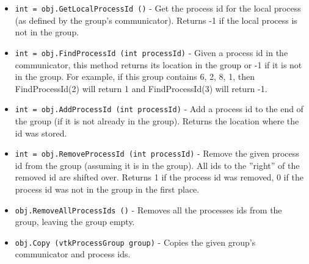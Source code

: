 \begin{itemize}
\item  \verb|int = obj.GetLocalProcessId ()| -  Get the process id for the local process (as defined by the group's
 communicator).  Returns -1 if the local process is not in the group.

\item  \verb|int = obj.FindProcessId (int processId)| -  Given a process id in the communicator, this method returns its location in
 the group or -1 if it is not in the group.  For example, if this group
 contains {6, 2, 8, 1}, then FindProcessId(2) will return 1 and
 FindProcessId(3) will return -1.

\item  \verb|int = obj.AddProcessId (int processId)| -  Add a process id to the end of the group (if it is not already in the
 group).  Returns the location where the id was stored.

\item  \verb|int = obj.RemoveProcessId (int processId)| -  Remove the given process id from the group (assuming it is in the group).
 All ids to the ''right'' of the removed id are shifted over.  Returns 1
 if the process id was removed, 0 if the process id was not in the group
 in the first place.

\item  \verb|obj.RemoveAllProcessIds ()| -  Removes all the processes ids from the group, leaving the group empty.

\item  \verb|obj.Copy (vtkProcessGroup group)| -  Copies the given group's communicator and process ids.

\end{itemize}
